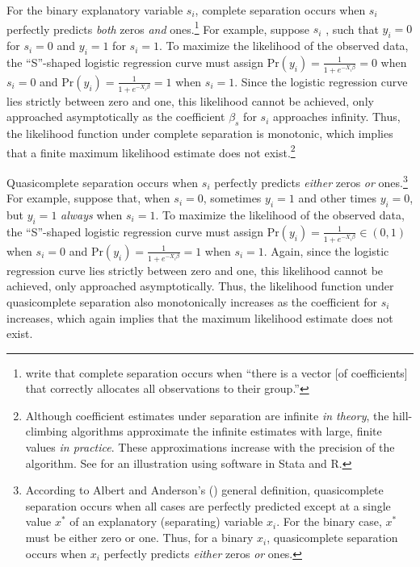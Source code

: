 \documentclass[12pt]{article}
\begin{document}
For the binary explanatory variable $s_i$, complete separation occurs when $s_i$ perfectly predicts \emph{both} zeros \emph{and} ones.\footnote{
\citet[p. 38]{AlbertAnderson1984} write that complete separation occurs when ``there is a vector [of coefficients] that correctly allocates all observations to their group.''} 
For example, suppose $s_i$ , such that $y_i = 0$ for $s_i = 0$ and $y_i = 1$ for $s_i = 1$. 
To maximize the likelihood of the observed data, the ``S''-shaped logistic regression curve must assign $\text{Pr}(y_i) = \frac{1}{1 + e^{-X_i\beta}} = 0$ when $s_i  = 0$ and $\text{Pr}(y_i) = \frac{1}{1 + e^{-X_i\beta}} = 1$ when $s_i = 1$. 
Since the logistic regression curve lies strictly between zero and one, this likelihood cannot be achieved, only approached asymptotically as the coefficient $\beta_s$ for $s_i$ approaches infinity. 
Thus, the likelihood function under complete separation is monotonic, which implies that a finite maximum likelihood estimate does not exist.\footnote{
Although coefficient estimates under separation are infinite \emph{in theory}, the hill-climbing algorithms approximate the infinite estimates with large, finite values \emph{in practice}. 
These approximations increase with the precision of the algorithm. 
See \cite{Zorn2005} for an illustration using software in Stata and R.}

Quasicomplete separation occurs when $s_i$ perfectly predicts \emph{either} zeros \emph{or} ones.\footnote{
According to Albert and Anderson's (\citeyear{AlbertAnderson1984}) general definition, quasicomplete separation occurs when all cases are perfectly predicted except at a single value $x^*$ of an explanatory (separating) variable $x_i$. 
For the binary case, $x^*$ must be either zero or one. 
Thus, for a binary $x_i$, quasicomplete separation occurs when $x_i$ perfectly predicts \emph{either} zeros \emph{or} ones.} 
For example, suppose that, when $s_i = 0$, sometimes $y_i = 1$ and other times $y_i = 0$, but $y_i = 1$ \emph{always} when $s_i = 1$. 
To maximize the likelihood of the observed data, the ``S''-shaped logistic regression curve must assign $\text{Pr}(y_i) = \frac{1}{1 + e^{-X_i\beta}} \in (0, 1)$ when $s_i  = 0$ and $\text{Pr}(y_i) = \frac{1}{1 + e^{-X_i\beta}} = 1$ when $s_i = 1$. 
Again, since the logistic regression curve lies strictly between zero and one, this likelihood cannot be achieved, only approached asymptotically. 
Thus, the likelihood function under quasicomplete separation also monotonically increases as the coefficient for $s_i$ increases, which again implies that the maximum likelihood estimate does not exist.
\end{document}

